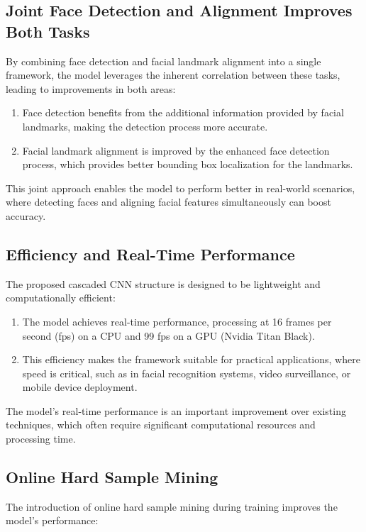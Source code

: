 \documentclass{report}
\begin{document}
	\subsection{Joint Face Detection and Alignment Improves Both Tasks}
	By combining face detection and facial landmark alignment into a single framework, the model leverages the inherent correlation between these tasks, leading to improvements in both areas:
	
	\begin{enumerate}
		\item 
		Face detection benefits from the additional information provided by facial landmarks, making the detection process more accurate.
		
		\item 
		Facial landmark alignment is improved by the enhanced face detection process, which provides better bounding box localization for the landmarks.
	\end{enumerate}
	This joint approach enables the model to perform better in real-world scenarios, where detecting faces and aligning facial features simultaneously can boost accuracy.
	
	\subsection{Efficiency and Real-Time Performance}
	The proposed cascaded CNN structure is designed to be lightweight and computationally efficient:
	
	\begin{enumerate}
		\item 
		The model achieves real-time performance, processing at 16 frames per second (fps) on a CPU and 99 fps on a GPU (Nvidia Titan Black).
		
		\item 
		This efficiency makes the framework suitable for practical applications, where speed is critical, such as in facial recognition systems, video surveillance, or mobile device deployment.
	\end{enumerate}
	The model’s real-time performance is an important improvement over existing techniques, which often require significant computational resources and processing time.
	
	
	\subsection{Online Hard Sample Mining}
	The introduction of online hard sample mining during training improves the model's performance:
	
\end{document}
